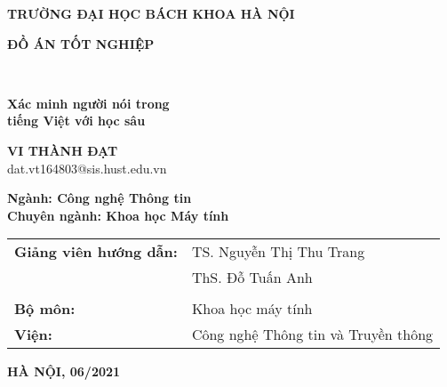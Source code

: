 \documentclass[a4paper, 13pt, oneside]{report}
\begin{document}
\fontsize{13pt}{16pt}
\selectfont

\begin{center}
    \thispagestyle{empty}
    \textsc{\LARGE \bfseries TRƯỜNG ĐẠI HỌC BÁCH KHOA HÀ NỘI }
    \vspace{0.5cm}
    
    \vspace{3cm}
    
    \begin{minipage}{0.9\textwidth} 
    \begin{center}
      \textsc{\huge  \bfseries ĐỒ ÁN TỐT NGHIỆP}
    \end{center}
    \end{minipage}\\[0.5cm]
  
    \vspace*{0.3cm}

    { \Huge \bfseries
    \vspace{5px} Xác minh người nói trong\\ tiếng Việt với học sâu}\\ [0.4cm]
    \vspace*{1cm}
    
    { \LARGE \bfseries
        VI THÀNH ĐẠT \\
    }
    {\Large dat.vt164803@sis.hust.edu.vn}
    \vspace{0.5cm}
    
    {\Large \textbf{Ngành: Công nghệ Thông tin}}\\
    {\Large \textbf{Chuyên ngành: Khoa học Máy tính}}
    
    \vspace{2.5cm}
    
    \begin{tabular}{ll}
    \textbf{Giảng viên hướng dẫn:} & TS. Nguyễn Thị Thu Trang \hrulefill \\
                                   & ThS. Đỗ Tuấn Anh \ \ \ \ \ \ \ \ \ \ \ \hrulefill \\
    & \\
    \textbf{Bộ môn:} & Khoa học máy tính \\
    \textbf{Viện:} & Công nghệ Thông tin và Truyền thông\\
    \end{tabular}
    

    \vspace{3.5cm} 	
    \begin{center}
        {\LARGE \bfseries HÀ NỘI, 06/2021}
    \end{center}
  
\end{center}
\end{document}
